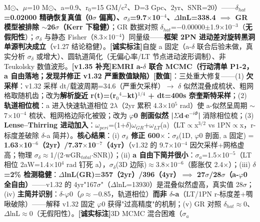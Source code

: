 \documentclass[UTF8,fontset=windows]{csoarticle}
\newcommand{\mtag}[1]{\textbf{[#1]}}
\newcommand{\up}[1]{\ensuremath{^{#1}}}
\newcommand{\down}[1]{\ensuremath{_{#1}}}
\begin{document}
M\ensuremath{\odot}、\ensuremath{\mu}=10 M\ensuremath{\odot}、a=0.9、r\down{0}=15 GM/c\up{2}、D=3 Gpc、2yr、SNR=20）------\textbf{\ensuremath{\delta}\down{hat}=0.02000 精确恢复真值（0\ensuremath{\sigma} 偏离）、\ensuremath{\sigma}\down{\delta{}}=9.7\ensuremath{\times}10\up{-4}、\ensuremath{\Delta}lnL=338.4 \ensuremath{\implies} GR 模型被排除 \ensuremath{\sim}26\ensuremath{\sigma}（Kerr 下稳健）}；GR 数据对照 \ensuremath{\delta}\down{hat}=\ensuremath{-}0.00000\ensuremath{\pm}1.9\ensuremath{\times}10\up{-3}（\textbf{无假阳性}）；\ensuremath{\sigma}\down{\delta{}} 与静态 Fisher（8.3\ensuremath{\times}10\up{-4}）同量级------\textbf{框架 2PN 进动差对旋转黑洞单源判决成立}（v1.27 结论稳健）。\mtag{诚实标注}自旋 a 固定（a-\ensuremath{\delta} 联合后验未做，真实分析 \ensuremath{\sigma}\down{\delta{}} 或增大）、圆轨道简化（无偏心率/LT 节点进动波形调制）、非 Teukolsky 数值波形。\textbf{\mtag{v1.35 补充}EMRI a-\ensuremath{\delta} 联合 MCMC（行动清单 P1-2，a 自由落地；发现并修正 v1.32 严重数值缺陷）}\mtag{数值}：三处重大修复------(1) \textbf{欠采样}：v1.32 采样 dt/载波周期=34.6（严重欠采样）\ensuremath{\to} \ensuremath{\delta} 似然混叠成梳状、粗网格取随机齿；改为\textbf{解析旋近 r(t)=(r\down{0}\up{4}\ensuremath{-}kt)\up{1/4} + dt=400s 奈奎斯特采样}；(2) \textbf{轨道相位梳}：a 进入快速轨道相位 2\ensuremath{\lambda}（2yr 累积 4.3\ensuremath{\times}10\up{5} rad）使 a-似然呈周期 \ensuremath{\sim}7\ensuremath{\times}10\up{-4} 梳状、粗网格边际化被毁；改为 \textbf{\ensuremath{\varphi}0 剖面似然 |\ensuremath{\Sigma}d\ensuremath{\cdot}e\up{-i\Phi{}}|} 消除相位梳；(3) \textbf{Lense--Thirring 进动加入}：\ensuremath{\omega}\down{peri}=(1+\ensuremath{\delta})\ensuremath{\omega}\down{GR}+\ensuremath{\omega}\down{LT}(a)（LT\ensuremath{\propto}x\up{3/2} vs 1PN\ensuremath{\propto}x，r-标度差破除 \ensuremath{\delta}-a 简并）。\textbf{核心结果}：(i) \textbf{\ensuremath{\sigma}\down{\delta{}} 修正 600\ensuremath{\times}}：\ensuremath{\sigma}\down{\delta{}}(1D, \ensuremath{\varphi}0 剖面, a 固定) = \textbf{1.63\ensuremath{\times}10\up{-6}（2yr）/7.37\ensuremath{\times}10\up{-7}（4yr）}（v1.32 的 9.7\ensuremath{\times}10\up{-4} 因欠采样+网格虚高；物理 \ensuremath{\sigma}\down{\delta{}}\ensuremath{\approx}1/(2\ensuremath{\cdot}wGR\down{total}\ensuremath{\cdot}SNR)）；(ii) \textbf{a 自由下简并很小}：\ensuremath{\sigma}\down{a}=1.5\ensuremath{\times}10\up{-5}（LT 相位 2aW=1.4\ensuremath{\times}10\up{4} rad 钉死 a），\ensuremath{\sigma}\down{\delta{}}(3D 边际)\ensuremath{\approx}3.8\ensuremath{\times}10\up{-6}（膨胀仅 2.4\ensuremath{\times}）；(iii) \textbf{\ensuremath{\delta}=2\% 检测稳健}：\textbf{\ensuremath{\Delta}lnL(GR)=357（2yr）/396（4yr）\ensuremath{\implies} 27\ensuremath{\sigma}/28\ensuremath{\sigma}（a-\ensuremath{\varphi}0 全自由）}------v1.32 的 4yr"167\ensuremath{\sigma}"（\ensuremath{\Delta}lnL=13930）是混叠似然虚高，真实值 28\ensuremath{\sigma}；(iv) \textbf{主简并识别}：\ensuremath{\delta}-\ensuremath{\varphi}0（\ensuremath{\rho}\ensuremath{\approx}\ensuremath{-}0.85，轨道相位）\textbf{而非 \ensuremath{\delta}-a}（LT/1PN r-标度差+啁啾破除）------解释 v1.32 固定 \ensuremath{\varphi}0 获得"过高精度"的机制；(v) GR 对照 \ensuremath{\delta}\down{hat}\ensuremath{\approx}0、\ensuremath{\Delta}lnL\ensuremath{\approx}0（无假阳性）。\mtag{诚实标注}3D MCMC 混合困难（\ensuremath{\sigma}\down{a} 
\end{document}
